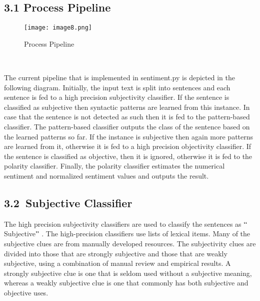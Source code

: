 \documentclass[12pt]{article}
\begin{document}
\subsection*{3.1  Process Pipeline}
\begin{Center}



\begin{figure}[H]
	\begin{Center}
		\texttt{[image: image8.png]}
		\caption{Process Pipeline}
		\label{fig:Process Pipeline}
	\end{Center}
\end{figure}



\\
\textbf{\textit{}}
\end{Center}\par


\vspace{\baselineskip}
\tab The current pipeline that is implemented in sentiment.py is depicted in the following diagram. Initially, the input text is split into sentences and each sentence is fed to a high precision subjectivity classifier. If the sentence is classified as subjective then syntactic patterns are learned from this instance. In case that the sentence is not detected as such then it is fed to the pattern-based classifier. The pattern-based classifier outputs the class of the sentence based on the learned patterns so far. If the instance is subjective then again more patterns are learned from it, otherwise it is fed to a high precision objectivity classifier. If the sentence is classified as objective, then it is ignored, otherwise it is fed to the polarity classifier. Finally, the polarity classifier estimates the numerical sentiment and normalized sentiment values and outputs the result.\par

\subsection*{3.2\  Subjective Classifier}
\tab The high precision subjectivity classifiers are used to classify the sentences as $``$Subjective$"$ . The high-precision classifiers use lists of lexical items. Many of the subjective clues are from manually developed resources. The subjectivity clues are divided into those that are strongly subjective and those that are weakly subjective, using a combination of manual review and empirical results. A strongly subjective clue is one that is seldom used without a subjective meaning, whereas a weakly subjective clue is one that commonly has both subjective and objective uses.\par
\end{document}
